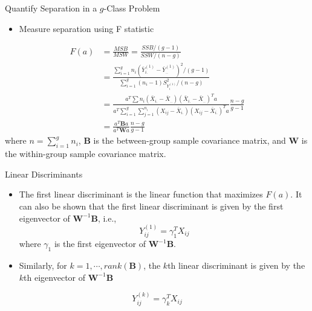 \documentclass[
  ignorenonframetext,
]{beamer}
\providecommand{\tightlist}{%
  \setlength{\itemsep}{0pt}\setlength{\parskip}{0pt}}
\begin{document}
\begin{frame}{Quantify Separation in a \(g\)-Class Problem}
\protect\hypertarget{quantify-separation-in-a-g-class-problem}{}
\begin{itemize}
\tightlist
\item
  Measure separation using F statistic
\end{itemize}

\[\begin{aligned}
F(a) &= \frac{MSB}{MSW}=\frac{SSB/(g-1)}{SSW/(n-g)}\\
&= \frac{\sum_{i=1}^g n_i (\bar Y_{i.}^{(1)} -\bar Y_{..}^{(1)})^2/(g-1)}{\sum_{i=1}^g (n_i-1)S_{Y_i^{(1)}}^2/(n-g)}\\
&=\frac{a^T \sum n_i (\bar X_{i.} -\bar X_{..})(\bar X_{i.}-\bar X_{..})^T a}{a^T \sum_{i=1}^g\sum_{j=1}^{n_i} (X_{ij} -\bar X_{i.})(X_{ij}-\bar X_{i.})^T a}\frac{n-g}{g-1}\\
&= \frac{a^T \mathbf B a}{a^T \mathbf W a}\frac{n-g}{g-1}
\end{aligned}\] where \(n=\sum_{i=1}^g n_i\), \(\mathbf B\) is the
between-group sample covariance matrix, and \(\mathbf W\) is the
within-group sample covariance matrix.
\end{frame}

\begin{frame}{Linear Discriminants}
\protect\hypertarget{linear-discriminants}{}
\begin{itemize}
\item
  The first linear discriminant is the linear function that maximizes
  \(F(a)\). It can also be shown that the first linear discriminant is
  given by the first eigenvector of \(\mathbf W ^{-1} \mathbf B\), i.e.,
  \[Y_{ij}^{(1)}=\gamma_1^T X_{ij}\] where \(\gamma_1\) is the first
  eigenvector of \(\mathbf W ^{-1} \mathbf B\).
\item
  Similarly, for \(k=1, \cdots, rank(\mathbf B)\), the \(k\)th linear
  discriminant is given by the \(k\)th eigenvector of
  \(\mathbf W ^{-1} \mathbf B\)
\end{itemize}

\[Y_{ij}^{(k)}=\gamma_k^T X_{ij}\]
\end{frame}
\end{document}
